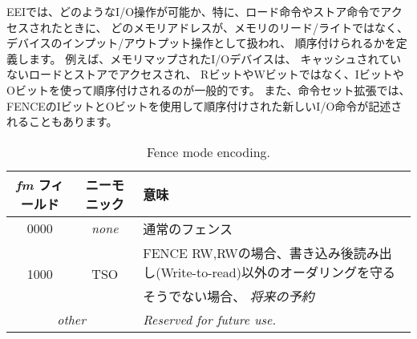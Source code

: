 \begin{comment}
The EEI will define what I/O operations are possible, and in
particular, which memory addresses when accessed by load and store instructions will be treated and
ordered as device input and device output operations respectively
rather than memory reads and writes.  For example, memory-mapped I/O
devices will typically be accessed with uncached loads and stores that
are ordered using the I and O bits rather than the R and W bits.
Instruction-set extensions might also describe new I/O
instructions that will also be ordered using the I and O bits in a
FENCE.
\end{comment}

EEIでは、どのようなI/O操作が可能か、特に、ロード命令やストア命令でアクセスされたときに、
どのメモリアドレスが、メモリのリード/ライトではなく、デバイスのインプット/アウトプット操作として扱われ、
順序付けられるかを定義します。
例えば、メモリマップされたI/Oデバイスは、
キャッシュされていないロードとストアでアクセスされ、
RビットやWビットではなく、IビットやOビットを使って順序付けされるのが一般的です。
また、命令セット拡張では、FENCEのIビットとOビットを使用して順序付けされた新しいI/O命令が記述されることもあります。


\begin{table}[htp]
\begin{small}
\begin{center}
\begin{tabular}{|c|c|l|}
\hline
{\em fm} フィールド & ニーモニック & 意味 \\
\hline
0000 & \em none & 通常のフェンス \\
\hline
\multirow{2}{*}{1000} & \multirow{2}{*}{TSO} & FENCE RW,RWの場合、書き込み後読み出し(Write-to-read)以外のオーダリングを守る \\
                      &                      & そうでない場合、 \em 将来の予約 \\
\hline
\multicolumn{2}{|c|}{\em other} & \em Reserved for future use. \\
\hline
\end{tabular}
\end{center}
\end{small}
\caption{Fence mode encoding.}
\label{fm}
\end{table}

\begin{comment}
The fence mode field {\em fm} defines the semantics of the FENCE.  A
FENCE with {\em fm}=0000 orders all memory operations in its
predecessor set before all memory operations in its successor set. 
\end{comment}


